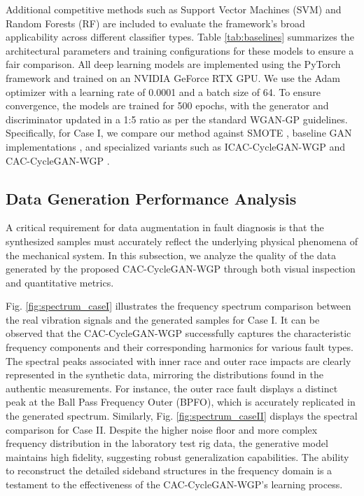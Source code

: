Additional competitive methods such as Support Vector Machines (SVM) \cite{Cortes1995} and Random Forests (RF) \cite{Breiman2001} are included to evaluate the framework's broad applicability across different classifier types. Table \ref{tab:baselines} summarizes the architectural parameters and training configurations for these models to ensure a fair comparison. All deep learning models are implemented using the PyTorch framework and trained on an NVIDIA GeForce RTX GPU. We use the Adam optimizer \cite{Kingma2015} with a learning rate of 0.0001 and a batch size of 64. To ensure convergence, the models are trained for 500 epochs, with the generator and discriminator updated in a 1:5 ratio as per the standard WGAN-GP guidelines. Specifically, for Case I, we compare our method against SMOTE \cite{6}, baseline GAN implementations \cite{1}, and specialized variants such as ICAC-CycleGAN-WGP \cite{26} and CAC-CycleGAN-WGP \cite{35}.

\subsection{Data Generation Performance Analysis}
A critical requirement for data augmentation in fault diagnosis is that the synthesized samples must accurately reflect the underlying physical phenomena of the mechanical system. In this subsection, we analyze the quality of the data generated by the proposed CAC-CycleGAN-WGP through both visual inspection and quantitative metrics.

Fig. \ref{fig:spectrum_caseI} illustrates the frequency spectrum comparison between the real vibration signals and the generated samples for Case I. It can be observed that the CAC-CycleGAN-WGP successfully captures the characteristic frequency components and their corresponding harmonics for various fault types. The spectral peaks associated with inner race and outer race impacts are clearly represented in the synthetic data, mirroring the distributions found in the authentic measurements. For instance, the outer race fault displays a distinct peak at the Ball Pass Frequency Outer (BPFO), which is accurately replicated in the generated spectrum. Similarly, Fig. \ref{fig:spectrum_caseII} displays the spectral comparison for Case II. Despite the higher noise floor and more complex frequency distribution in the laboratory test rig data, the generative model maintains high fidelity, suggesting robust generalization capabilities. The ability to reconstruct the detailed sideband structures in the frequency domain is a testament to the effectiveness of the CAC-CycleGAN-WGP's learning process.

